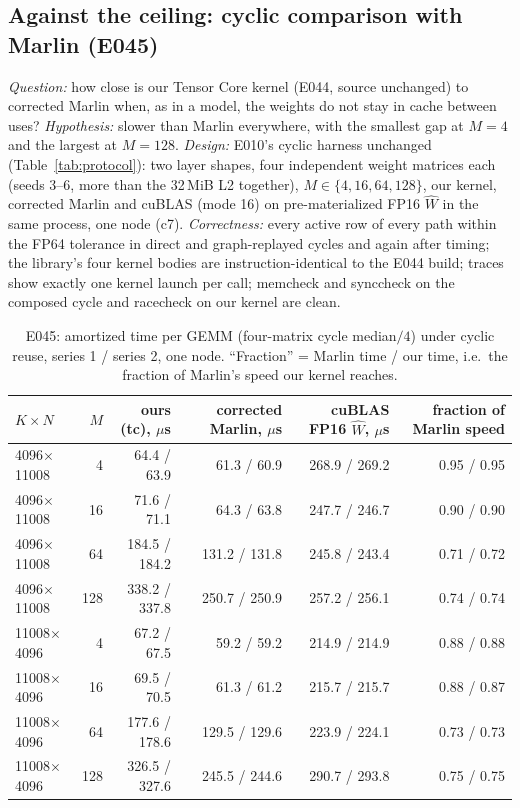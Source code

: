 \documentclass[sigconf,nonacm]{acmart}
\begin{document}
\subsection{Against the ceiling: cyclic comparison with Marlin (E045)}
\label{sec:e045}
\emph{Question:} how close is our Tensor Core kernel (E044, source unchanged) to corrected Marlin when, as in a model, the weights do not stay in cache between uses? \emph{Hypothesis:} slower than Marlin everywhere, with the smallest gap at $M=4$ and the largest at $M=128$. \emph{Design:} E010's cyclic harness unchanged (Table~\ref{tab:protocol}): two layer shapes, four independent weight matrices each (seeds 3--6, more than the 32\,MiB L2 together), $M \in \{4,16,64,128\}$, our kernel, corrected Marlin and cuBLAS (mode 16) on pre-materialized FP16 $\hat W$ in the same process, one node (c7). \emph{Correctness:} every active row of every path within the FP64 tolerance in direct and graph-replayed cycles and again after timing; the library's four kernel bodies are instruction-identical to the E044 build; traces show exactly one kernel launch per call; memcheck and synccheck on the composed cycle and racecheck on our kernel are clean.

\begin{table}[t]
\caption{E045: amortized time per GEMM (four-matrix cycle median$/4$) under cyclic reuse, series 1 / series 2, one node. ``Fraction'' = Marlin time / our time, i.e.\ the fraction of Marlin's speed our kernel reaches.}
\label{tab:e045}
\small
\begin{tabular}{lrrrrr}
\toprule
$K\times N$ & $M$ & ours (tc), $\mu$s & corrected Marlin, $\mu$s & cuBLAS FP16 $\hat W$, $\mu$s & fraction of Marlin speed \\
\midrule
4096$\times$11008 & 4 & 64.4 / 63.9 & 61.3 / 60.9 & 268.9 / 269.2 & 0.95 / 0.95 \\
4096$\times$11008 & 16 & 71.6 / 71.1 & 64.3 / 63.8 & 247.7 / 246.7 & 0.90 / 0.90 \\
4096$\times$11008 & 64 & 184.5 / 184.2 & 131.2 / 131.8 & 245.8 / 243.4 & 0.71 / 0.72 \\
4096$\times$11008 & 128 & 338.2 / 337.8 & 250.7 / 250.9 & 257.2 / 256.1 & 0.74 / 0.74 \\
11008$\times$4096 & 4 & 67.2 / 67.5 & 59.2 / 59.2 & 214.9 / 214.9 & 0.88 / 0.88 \\
11008$\times$4096 & 16 & 69.5 / 70.5 & 61.3 / 61.2 & 215.7 / 215.7 & 0.88 / 0.87 \\
11008$\times$4096 & 64 & 177.6 / 178.6 & 129.5 / 129.6 & 223.9 / 224.1 & 0.73 / 0.73 \\
11008$\times$4096 & 128 & 326.5 / 327.6 & 245.5 / 244.6 & 290.7 / 293.8 & 0.75 / 0.75 \\
\bottomrule
\end{tabular}
\end{table}
\end{document}
